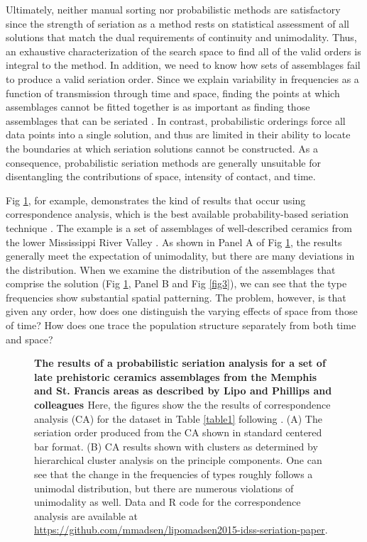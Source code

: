 \documentclass[10pt,letterpaper]{article}
\begin{document}
Ultimately, neither manual sorting nor probabilistic methods are satisfactory since the strength of seriation as a method rests on statistical assessment of all solutions that match the dual requirements of continuity and unimodality.   Thus, an exhaustive characterization of the search space to find all of the valid orders is integral to the method. In addition, we need to know how sets of assemblages fail to produce a valid seriation order. Since we explain variability in frequencies as a function of transmission through time and space, finding the points at which assemblages cannot be fitted together is as important as finding those assemblages that can be seriated \cite{Lipo1997Population,Lipo2008}. In contrast, probabilistic orderings force all data points into a single solution, and thus are limited in their ability to locate the boundaries at which seriation solutions cannot be constructed. As a consequence, probabilistic seriation methods are generally unsuitable for disentangling the contributions of space, intensity of contact, and time. 

Fig \ref{fig2}, for example, demonstrates the kind of results that occur using correspondence analysis, which is the best available probability-based seriation technique \cite{Bellanger2008,Djindjian:1984aa,Peebles2012,Smith2005}.  The example is a set of assemblages of well-described ceramics from the lower Mississippi River Valley \cite{Lipo1997Population,Lipo2001a,Phillips1951}. As shown in Panel A of Fig \ref{fig2}, the results generally meet the expectation of unimodality, but there are many deviations in the distribution. When we examine the distribution of the assemblages that comprise the solution (Fig \ref{fig2}, Panel B and Fig \ref{fig3}), we can see that the type frequencies show substantial spatial patterning. The problem, however, is that given any order, how does one distinguish the varying effects of space from those of time? How does one trace the population structure separately from both time and space?

\begin{figure}[h]
\caption{ {\bf The results of a probabilistic seriation analysis for a set of late prehistoric ceramics assemblages from the Memphis and St. Francis areas as described by Lipo \cite{Lipo2000} and Phillips and colleagues \cite{Phillips1951} } Here, the figures show the the results of correspondence analysis (CA) for the dataset in Table \ref{table1} following \cite{Alberti2013}. (A) The seriation order produced from the CA shown in standard centered bar format. (B) CA results shown with clusters as determined by hierarchical cluster analysis on the principle components. One can see that the change in the frequencies of types roughly follows a unimodal distribution, but there are numerous violations of unimodality as well. Data and R code for the correspondence analysis are available at \url{https://github.com/mmadsen/lipomadsen2015-idss-seriation-paper}. }
\label{fig2}
\end{figure}
\end{document}

